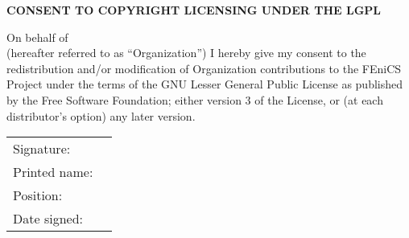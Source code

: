 \documentclass[11pt]{article}
\begin{document}
\pagestyle{empty}

\large

\begin{center}
  \textbf{CONSENT TO COPYRIGHT LICENSING UNDER THE LGPL}
\end{center}

\normalsize

\vspace{1cm}

On behalf of \underline{\hspace{12.5cm}} \\ (hereafter referred to as
``Organization'') I hereby give my consent to the redistribution
and/or modification of Organization contributions to the FEniCS
Project\footnotemark{} under the terms of the GNU Lesser General
Public License as published by the Free Software Foundation; either
version 3 of the License, or (at each distributor's option) any later
version.

\vspace{2cm}

\begin{tabular}{ll}
Signature:     & \underline{\hspace{9cm}} \\[2cm]
Printed name:  & \underline{\hspace{9cm}} \\[2cm]
Position:      & \underline{\hspace{9cm}} \\[2cm]
Date signed:   & \underline{\hspace{9cm}}
\end{tabular}


\end{document}
